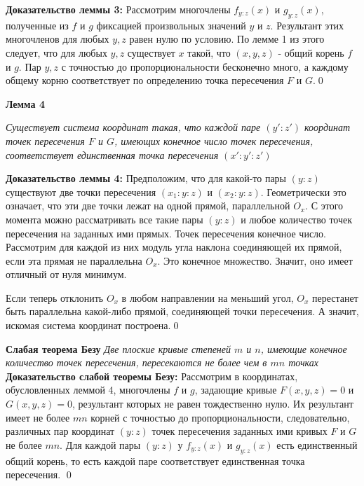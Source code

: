 \documentclass[a4paper, 12pt]{article}
\begin{document}
\textbf{Доказательство леммы 3:}\newline
Рассмотрим многочлены $f_{y:z}(x)$ и $g_{y:z}(x)$, полученные из $f$ и $g$ фиксацией произвольных значений $y$ и $z$. Результант этих многочленов для любых $y,z$ равен нулю по условию. По лемме 1 из этого следует, что для любых $y,z$ существует $x$ такой, что $(x,y,z)$ - общий корень $f$ и $g$. Пар $y,z$ с точностью до пропорциональности бесконечно много, а каждому общему корню соответствует по определению точка пересечения $F$ и $G$.\qed\newline

\smallskip
\textbf{Лемма 4}

\textit{Существует система координат такая, что каждой паре $(y':z')$ координат точек пересечения $F$ и $G$, имеющих конечное число точек пересечения, соответствует единственная точка пересечения $(x':y':z')$}\newline

\textbf{Доказательство леммы 4:}\newline
Предположим, что для какой-то пары $(y:z)$ существуют две точки пересечения $(x_1:y:z)$ и $(x_2:y:z)$. Геометрически это означает, что эти две точки лежат на одной прямой, параллельной $O_x$. С этого момента можно рассматривать все такие пары $(y:z)$ и любое количество точек пересечения на заданных ими прямых. Точек пересечения конечное число. Рассмотрим для каждой из них модуль угла наклона соединяющей их прямой, если эта прямая не параллельна $O_x$. Это конечное множество. Значит, оно имеет отличный от нуля минимум.\par Если теперь отклонить $O_x$ в любом направлении на меньший угол, $O_x$ перестанет быть параллельна какой-либо прямой, соединяющей точки пересечения. А значит, искомая система координат построена.\qed\newline

\bigskip
\textbf{Слабая теорема Безу}
\textit{Две плоские кривые степеней $m$ и $n$, имеющие конечное количество точек пересечения, пересекаются не более чем в $mn$ точках}\newline
\smallskip
\textbf{Доказательство слабой теоремы Безу:}\newline
Рассмотрим в координатах, обусловленных леммой 4, многочлены $f$ и $g$, задающие кривые $F(x,y,z) = 0$ и $G(x,y,z) = 0$, результант которых не равен тождественно нулю. Их результант имеет не более $mn$ корней с точностью до пропорциональности, следовательно, различных пар координат $(y:z)$ точек пересечения заданных ими кривых $F$ и $G$ не более $mn$. Для каждой пары $(y:z)$ у $f_{y:z}(x)$ и $g_{y:z}(x)$ есть единственный общий корень, то есть каждой паре соответствует единственная точка пересечения. \qed\newline
\end{document}
